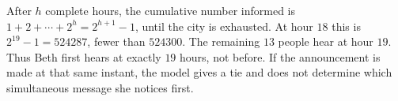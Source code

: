 After $h$ complete hours, the cumulative number informed is $1+2+\cdots+2^h=2^{h+1}-1$, until the city is exhausted. At hour $18$ this is $2^{19}-1=524287$, fewer than $524300$. The remaining $13$ people hear at hour $19$. Thus Beth first hears at exactly $19$ hours, not before. If the announcement is made at that same instant, the model gives a tie and does not determine which simultaneous message she notices first.

